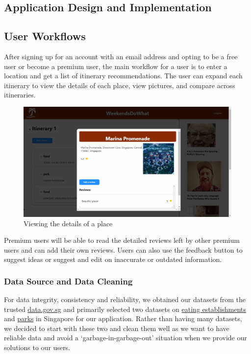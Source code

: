 \documentclass[12pt,a4paper]{article}
\begin{document}
    \subsection{Application Design and Implementation}
        \subsection{User Workflows}
        
        After signing up for an account with an email address and opting to be a free user or become a premium user, the main workflow for a user is to enter a location and get a list of itinerary recommendations. The user can expand each itinerary to view the details of each place, view pictures, and compare across itineraries.
        
        \begin{figure}[H]
        	\centering
        	\includegraphics[width=1\textwidth]{figures/place-detail.png}
        	\caption{Viewing the details of a place}
        	\label{view_place_details}
        \end{figure}
        
        Premium users will be able to read the detailed reviews left by other premium users and can add their own reviews. Users can also use the feedback button to suggest ideas or suggest and edit on inaccurate or outdated information.
        
    
        \subsubsection{Data Source and Data Cleaning}
        
        For data integrity, consistency and reliability, we obtained our datasets from the trusted \url{data.gov.sg} and primarily selected two datasets on \href{https://data.gov.sg/dataset/eating-establishments}{eating establishments} and \href{https://data.gov.sg/dataset/parks}{parks} in Singapore for our application. Rather than having many datasets, we decided to start with these two and clean them well as we want to have reliable data and avoid a ‘garbage-in-garbage-out’ situation when we provide our solutions to our users.
\end{document}
